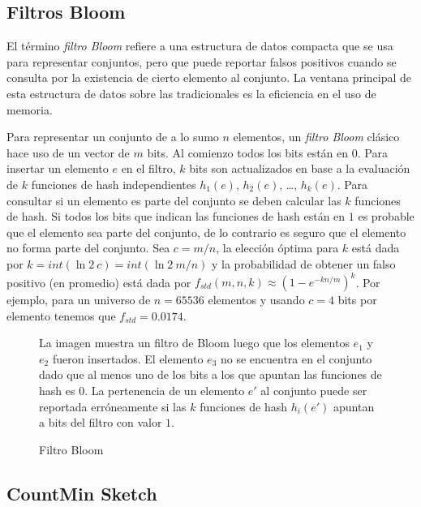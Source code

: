\documentclass[a4paper,10pt, oneside]{article}
\begin{document}
\subsection*{Filtros Bloom}

El término \textit{filtro Bloom} refiere a una estructura de datos compacta que se usa para representar conjuntos, pero que puede reportar falsos positivos cuando se consulta por la existencia de cierto elemento al conjunto\cite{Putze:2010:CHS:1498698.1594230}. La ventana principal de esta estructura de datos sobre las tradicionales es la eficiencia en el uso de memoria.

Para representar un conjunto de a lo sumo $n$ elementos, un \textit{filtro Bloom} clásico hace uso de un vector de $m$ bits. Al comienzo todos los bits están en $0$. Para insertar un elemento $e$ en el filtro, $k$ bits son actualizados en base a la evaluación de $k$ funciones de hash independientes $h_1(e)$, $h_2(e)$, \dots, $h_k(e)$. Para consultar si un elemento es parte del conjunto se deben calcular las $k$ funciones de hash. Si todos los bits que indican las funciones de hash están en $1$ es probable que el elemento sea parte del conjunto, de lo contrario es seguro que el elemento no forma parte del conjunto. Sea $c=m/n$, la elección óptima para $k$ está dada por $k=int(\ln 2 \ c) = int(\ln 2 \ m/n)$ y la probabilidad de obtener un falso positivo (en promedio) está dada por $f_{std} (m,n,k) \approx (1-e^{-kn/m})^k$\cite{Bloom:1970:STH:362686.362692}. Por ejemplo, para un universo de $n=65536$ elementos y usando $c=4$ bits por elemento tenemos que $f_{std}=0.0174$.

\begin{figure}[htbp]
	\centering
	
	\caption{Filtro Bloom}

	\medskip
	\small

	\parbox{13.1cm}{La imagen muestra un filtro de Bloom luego que los elementos $e_1$ y $e_2$ fueron insertados. El elemento $e_3$ no se encuentra en el conjunto dado que al menos uno de los bits a los que apuntan las funciones de hash es $0$. La pertenencia de un elemento $e'$ al conjunto puede ser reportada erróneamente si las $k$ funciones de hash $h_i(e')$ apuntan a bits del filtro con valor $1$.}

\end{figure}

\subsection*{CountMin Sketch}
\end{document}
